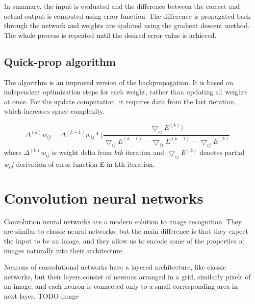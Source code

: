 In summary, the input is evaluated and the difference between the correct and actual output is computed using error function. The difference is propagated back through the network and weights are updated using the gradient descent method. The whole process is repeated until the desired error value is achieved.


\subsection{Quick-prop algorithm}
The algorithm is an improved version of the backpropagation. It is based on independent optimization steps for each weight, rather than updating all weights at once. For the update computation, it requires data from the last iteration, which increases space complexity. 

\begin{equation*}
\Delta ^{(k)} w_{ij} = \Delta^{(k-1)} w_{ij}*(\frac {\bigtriangledown_{ij} E^{(k)})} {\bigtriangledown_{ij} E^{(k-1)} - \bigtriangledown_{ij} E^(k-1) - \bigtriangledown_{ij} E^{(k)} }
\end{equation*}
where $\Delta ^{(k)} w_{ij}$ is weight delta from \emph{kth} iteration and $\bigtriangledown_{ij} E^(k)$ denotes partial $w_ij$-derivation of error function E in kth iteration.

\section{Convolution neural networks}
Convolution neural networks are a modern solution to image recognition. They are similar to classic neural networks, but the main difference is that they expect the input to be an image, and they allow us to encode some of the properties of images naturally into their architecture.

Neurons of convolutional networks have a layered architecture, like classic networks, but their layers consist of neurons arranged in a grid, similarly pixels of an image, and each neuron is connected only to a small corresponding area in next layer.  
TODO image


